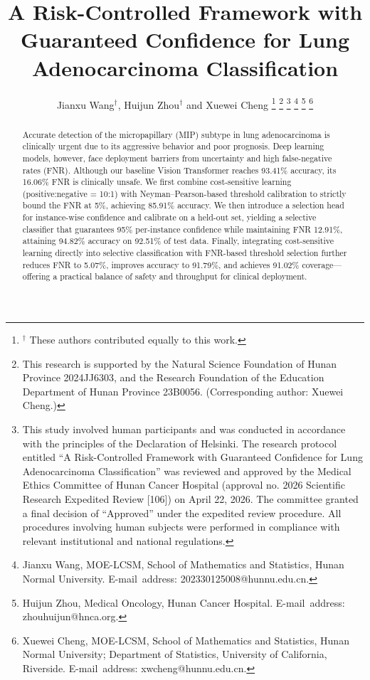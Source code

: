 \documentclass[journal,twoside,web]{ieeecolor}
\begin{document}
\title{A Risk-Controlled Framework with Guaranteed Confidence for Lung Adenocarcinoma Classification}
\author{Jianxu Wang$^{\dagger}$, Huijun Zhou$^{\dagger}$ and Xuewei Cheng
\thanks{$^{\dagger}$ These authors contributed equally to this work.}
\thanks{This research is supported by the Natural Science Foundation of Hunan Province 2024JJ6303, and the Research Foundation of the Education Department of Hunan Province 23B0056. (Corresponding author: Xuewei Cheng.)}
\thanks{This study involved human participants and was conducted in accordance with the principles of the Declaration of Helsinki. The research protocol entitled “A Risk-Controlled Framework with Guaranteed Confidence for Lung Adenocarcinoma Classification” was reviewed and approved by the Medical Ethics Committee of Hunan Cancer Hospital (approval no. 2026 Scientific Research Expedited Review [106]) on April 22, 2026. The committee granted a final decision of “Approved” under the expedited review procedure. All procedures involving human subjects were performed in compliance with relevant institutional and national regulations.}
\thanks{Jianxu Wang, MOE-LCSM, School of Mathematics and Statistics, Hunan Normal University. E-mail~address: 202330125008@hunnu.edu.cn.}
\thanks{Huijun Zhou, Medical Oncology, Hunan Cancer Hospital. E-mail~address: zhouhuijun@hnca.org.}
\thanks{Xuewei Cheng, MOE-LCSM, School of Mathematics and Statistics, Hunan Normal University; Department of Statistics, University of California, Riverside. E-mail~address: xwcheng@hunnu.edu.cn.}
}

\maketitle

\begin{abstract}
Accurate detection of the micropapillary (MIP) subtype in lung adenocarcinoma is clinically urgent due to its aggressive behavior and poor prognosis. Deep learning models, however, face deployment barriers from uncertainty and high false-negative rates (FNR). Although our baseline Vision Transformer reaches 93.41\% accuracy, its 16.06\% FNR is clinically unsafe. We first combine cost-sensitive learning (positive:negative = 10:1) with Neyman--Pearson-based threshold calibration to strictly bound the FNR at 5\%, achieving 85.91\% accuracy. We then introduce a selection head for instance-wise confidence and calibrate on a held-out set, yielding a selective classifier that guarantees 95\% per-instance confidence while maintaining FNR 12.91\%, attaining 94.82\% accuracy on 92.51\% of test data. Finally, integrating cost-sensitive learning directly into selective classification with FNR-based threshold selection further reduces FNR to 5.07\%, improves accuracy to 91.79\%, and achieves 91.02\% coverage---offering a practical balance of safety and throughput for clinical deployment.
\end{abstract}
\end{document}
